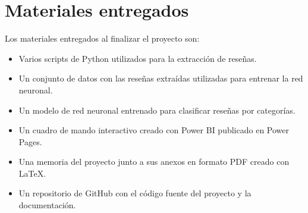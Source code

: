 \section{Materiales entregados}

Los materiales entregados al finalizar el proyecto son:

\begin{itemize}
    \item Varios scripts de Python utilizados para la extracción de reseñas.
    \item Un conjunto de datos con las reseñas extraídas utilizadas para entrenar la red neuronal.
    \item Un modelo de red neuronal entrenado para clasificar reseñas por categorías.   
    \item Un cuadro de mando interactivo creado con Power BI publicado en Power Pages.
    \item Una memoria del proyecto junto a sus anexos en formato PDF creado con \LaTeX.
    \item Un repositorio de GitHub con el código fuente del proyecto y la documentación.\cite{repositorio}
\end{itemize}
